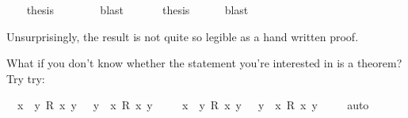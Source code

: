 \begin{isabellebody}
\ \ \isamarkupfalse%
\ {\isacharquery}thesis\isanewline
\ \ \ \ \ \ \isamarkupfalse%
\ blast\ \isacommand{{\isacharbraceright}}\isamarkupfalse%
\isanewline
\ \ \isamarkupfalse%
\ \isamarkupfalse%
\ {\isacharquery}thesis\isanewline
\ \ \ \ \isamarkupfalse%
\ blast\isanewline
{}\isamarkupfalse%
%
\endisatagproof
{\isafoldproof}%
%
\isadelimproof
%
\endisadelimproof
%
\begin{isamarkuptext}%
Unsurprisingly, the result is not quite so legible as a hand written proof.%
\end{isamarkuptext}\isamarkuptrue%
%
\isadelimdocument
%
\endisadelimdocument
%
\isatagdocument
%
\isamarkuptrue%
%
\endisatagdocument
{\isafolddocument}%
%
\isadelimdocument
%
\endisadelimdocument
%
\begin{isamarkuptext}%
What if you don't know whether the statement you're interested in is a theorem? Try try:%
\end{isamarkuptext}\isamarkuptrue%
\isamarkupfalse%
\ {\isachardoublequoteopen}{\isacharparenleft}{\isasymforall}\ x{\isachardot}\ {\isasymexists}\ y{\isachardot}\ R\ x\ y{\isacharparenright}\ {\isasymlongrightarrow}\ {\isacharparenleft}{\isasymexists}\ y{\isachardot}\ {\isasymforall}\ x{\isachardot}\ R\ x\ y{\isacharparenright}{\isachardoublequoteclose}\ \isamarkupfalse%
%
\isadelimproof
\ %
\endisadelimproof
%
\isatagproof
{}\isamarkupfalse%
%
\endisatagproof
{\isafoldproof}%
%
\isadelimproof
%
\endisadelimproof
\isanewline
\isanewline
{}\isamarkupfalse%
\ {\isachardoublequoteopen}{\isacharparenleft}{\isasymexists}\ x{\isachardot}\ {\isasymforall}\ y{\isachardot}\ R\ x\ y{\isacharparenright}\ {\isasymlongrightarrow}\ {\isacharparenleft}{\isasymforall}\ y{\isachardot}\ {\isasymexists}\ x{\isachardot}\ R\ x\ y{\isacharparenright}{\isachardoublequoteclose}\ \isamarkupfalse%
\isanewline
%
\isadelimproof
\ \ %
\endisadelimproof
%
\isatagproof
{}\isamarkupfalse%
\ auto\isanewline
%
\endisatagproof
{\isafoldproof}%
%
\isadelimproof
%
\endisadelimproof
%
\isadelimtheory
%
\endisadelimtheory
%
\isatagtheory
%
\endisatagtheory
{\isafoldtheory}%
%
\isadelimtheory
%
\endisadelimtheory
%
\end{isabellebody}%
\endinput
